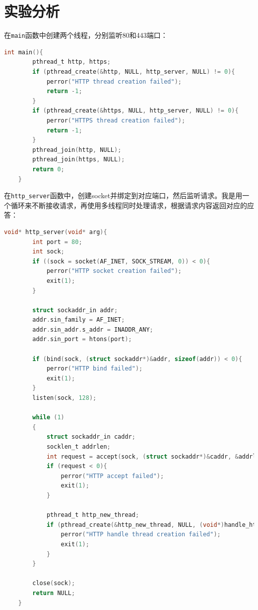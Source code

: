 \documentclass[UTF8]{article}
\begin{document}
\section{实验分析}

在\texttt{main}函数中创建两个线程，分别监听80和443端口：

\begin{lstlisting}[language=c]
    int main(){
        pthread_t http, https;
        if (pthread_create(&http, NULL, http_server, NULL) != 0){
            perror("HTTP thread creation failed");
            return -1;
        }
        if (pthread_create(&https, NULL, http_server, NULL) != 0){
            perror("HTTPS thread creation failed");
            return -1;
        }
        pthread_join(http, NULL);
        pthread_join(https, NULL);
        return 0;
    }
\end{lstlisting}

在\texttt{http\_server}函数中，创建socket并绑定到对应端口，然后监听请求。我是用一个循环来不断接收请求，再使用多线程同时处理请求，根据请求内容返回对应的应答：

\begin{lstlisting}[language=c]
    void* http_server(void* arg){
        int port = 80;
        int sock;
        if ((sock = socket(AF_INET, SOCK_STREAM, 0)) < 0){
            perror("HTTP socket creation failed");
            exit(1);
        }
        
        struct sockaddr_in addr;
        addr.sin_family = AF_INET;
        addr.sin_addr.s_addr = INADDR_ANY;
        addr.sin_port = htons(port);
    
        if (bind(sock, (struct sockaddr*)&addr, sizeof(addr)) < 0){
            perror("HTTP bind failed");
            exit(1);
        }
        listen(sock, 128);
        
        while (1)
        {
            struct sockaddr_in caddr;
            socklen_t addrlen;
            int request = accept(sock, (struct sockaddr*)&caddr, &addrlen);
            if (request < 0){
                perror("HTTP accept failed");
                exit(1);
            }
    
            pthread_t http_new_thread;
            if (pthread_create(&http_new_thread, NULL, (void*)handle_http_request, (void*)&request) != 0){
                perror("HTTP handle thread creation failed");
                exit(1);
            }
        }
    
        close(sock);
        return NULL;
    }
\end{lstlisting}
\end{document}
